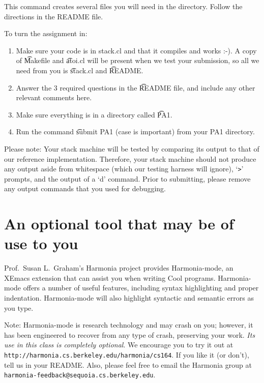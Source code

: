 \documentclass[11pt]{article}
\begin{document}
This command creates several files you will need in the directory.
Follow the directions in the README file.  

\medskip
To turn the assignment in:

\begin{enumerate}
\item Make sure your code is in stack.cl and that it compiles and works :-).
  A copy of \t{Makefile} and \t{atoi.cl} will be present when we test your
  submission, so all we need from you is \t{stack.cl} and \t{README}.
\item Answer the 3 required questions in the \t{README file}, and
include any other relevant comments here.
\item Make sure everything is in a directory called \t{PA1}.
\item Run the command \t{submit PA1} (case is important) from your PA1
  directory.
\end{enumerate}

Please note: Your stack machine will be tested by comparing its output
to that of our reference implementation.  Therefore, your stack
machine should not produce any output aside from whitespace (which our
testing harness will ignore), `{\tt >}' prompts, and the output of a
`d' command.  Prior to submitting, please remove any output commands
that you used for debugging.

\section*{An optional tool that may be of use to you}


Prof.~Susan L.~Graham's Harmonia project provides Harmonia-mode, an
XEmacs extension that can assist you when writing Cool programs.
Harmonia-mode offers a number of useful features, including syntax
highlighting and proper indentation.  Harmonia-mode will also
highlight syntactic and semantic errors as you type.

Note: Harmonia-mode is research technology and may crash on you;
however, it has been engineered to recover from any type of crash,
preserving your work.  {\em Its use in this class is completely
optional}.  We encourage you to try it out at
{\tt http://harmonia.cs.berkeley.edu/harmonia/cs164}.  If you like
it (or don't), tell us in your README.  Also, please feel free to
email the Harmonia group at {\tt harmonia-feedback@sequoia.cs.berkeley.edu}.
\end{document}
